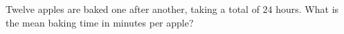 Twelve apples are baked one after another, taking a total of $24$ hours. What is the mean baking time in minutes per apple?
